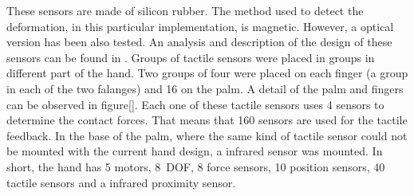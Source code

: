 These sensors are made of silicon rubber. The method used to
detect the deformation, in this particular implementation, is
magnetic. However, a optical version has been also tested. An
analysis and description of the design of these sensors can be
found in \cite{etorresjSoft}. Groups of tactile sensors were
placed in groups in different part of the hand. Two groups of four
were placed on each finger (a group in each of the two falanges)
and 16 on the palm. A detail of the palm and fingers can be
observed in figure\ref{}. Each one of these tactile sensors uses 4
sensors to determine the contact forces. That means that 160
sensors are used for the tactile feedback. In the base of the
palm, where the same kind of tactile sensor could not be mounted
with the current hand design, a infrared sensor was mounted. In
short, the hand has 5 motors, 8~DOF, 8 force sensors, 10 position
sensors, 40 tactile sensors and a infrared proximity sensor.




